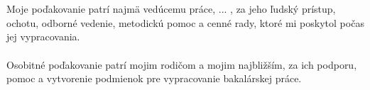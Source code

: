 \newpage
\thispagestyle{plain}
\vspace*{14cm} 
\noindent
\begin{center}
	\ifenglish
		{\large\textbf{\Thanks}} \\
	\else
		{\large\textbf{\Thankssk}} \\
	\fi
\end{center}

\noindent
Moje poďakovanie patrí najmä vedúcemu práce, ... , za jeho ľudský prístup, ochotu, odborné vedenie, metodickú pomoc a cenné rady, ktoré mi poskytol počas jej vypracovania. \\ \\
\noindent
Osobitné poďakovanie patrí mojim rodičom a mojim najbližším, za ich podporu, pomoc a vytvorenie podmienok pre vypracovanie bakalárskej práce.

\vspace*{0.7cm}
\noindent
\hspace{11.2cm}\Author